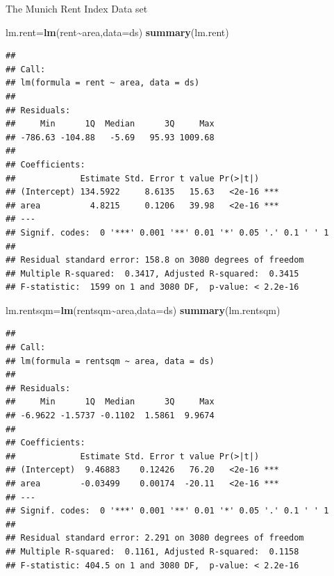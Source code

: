 \documentclass[
  ignorenonframetext,
]{beamer}
\newenvironment{Shaded}{\begin{snugshade}}{\end{snugshade}}
\newcommand{\AttributeTok}[1]{\textcolor[rgb]{0.13,0.29,0.53}{#1}}
\newcommand{\FunctionTok}[1]{\textcolor[rgb]{0.13,0.29,0.53}{\textbf{#1}}}
\newcommand{\NormalTok}[1]{#1}
\newcommand{\OtherTok}[1]{\textcolor[rgb]{0.56,0.35,0.01}{#1}}
\newcommand{\SpecialCharTok}[1]{\textcolor[rgb]{0.81,0.36,0.00}{\textbf{#1}}}
\begin{document}
\begin{frame}[fragile]
\begin{block}{The Munich Rent Index Data set}
\begin{Shaded}
\begin{Highlighting}[]
\NormalTok{lm.rent}\OtherTok{=}\FunctionTok{lm}\NormalTok{(rent}\SpecialCharTok{\textasciitilde{}}\NormalTok{area,}\AttributeTok{data=}\NormalTok{ds)}
\FunctionTok{summary}\NormalTok{(lm.rent)}
\end{Highlighting}
\end{Shaded}

\begin{verbatim}
## 
## Call:
## lm(formula = rent ~ area, data = ds)
## 
## Residuals:
##     Min      1Q  Median      3Q     Max 
## -786.63 -104.88   -5.69   95.93 1009.68 
## 
## Coefficients:
##             Estimate Std. Error t value Pr(>|t|)    
## (Intercept) 134.5922     8.6135   15.63   <2e-16 ***
## area          4.8215     0.1206   39.98   <2e-16 ***
## ---
## Signif. codes:  0 '***' 0.001 '**' 0.01 '*' 0.05 '.' 0.1 ' ' 1
## 
## Residual standard error: 158.8 on 3080 degrees of freedom
## Multiple R-squared:  0.3417, Adjusted R-squared:  0.3415 
## F-statistic:  1599 on 1 and 3080 DF,  p-value: < 2.2e-16
\end{verbatim}

\begin{Shaded}
\begin{Highlighting}[]
\NormalTok{lm.rentsqm}\OtherTok{=}\FunctionTok{lm}\NormalTok{(rentsqm}\SpecialCharTok{\textasciitilde{}}\NormalTok{area,}\AttributeTok{data=}\NormalTok{ds)}
\FunctionTok{summary}\NormalTok{(lm.rentsqm)}
\end{Highlighting}
\end{Shaded}

\begin{verbatim}
## 
## Call:
## lm(formula = rentsqm ~ area, data = ds)
## 
## Residuals:
##     Min      1Q  Median      3Q     Max 
## -6.9622 -1.5737 -0.1102  1.5861  9.9674 
## 
## Coefficients:
##             Estimate Std. Error t value Pr(>|t|)    
## (Intercept)  9.46883    0.12426   76.20   <2e-16 ***
## area        -0.03499    0.00174  -20.11   <2e-16 ***
## ---
## Signif. codes:  0 '***' 0.001 '**' 0.01 '*' 0.05 '.' 0.1 ' ' 1
## 
## Residual standard error: 2.291 on 3080 degrees of freedom
## Multiple R-squared:  0.1161, Adjusted R-squared:  0.1158 
## F-statistic: 404.5 on 1 and 3080 DF,  p-value: < 2.2e-16
\end{verbatim}


\end{block}
\end{frame}
\end{document}
